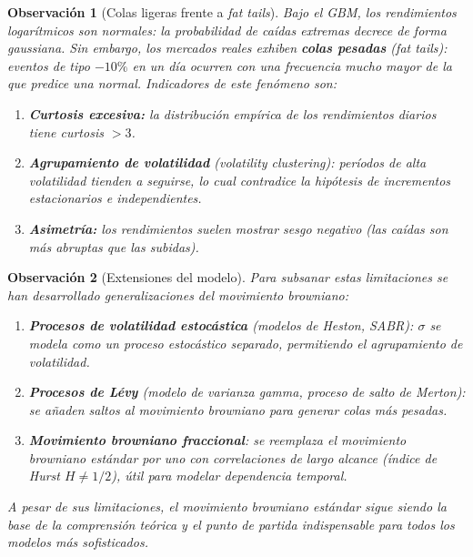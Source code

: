 \documentclass[12pt]{book}
\newtheorem{remark}{Observación}[chapter]
\begin{document}
\begin{remark}[Colas ligeras frente a \textit{fat tails}]
Bajo el GBM, los rendimientos logarítmicos son normales: la probabilidad de caídas extremas decrece de forma gaussiana. Sin embargo, los mercados reales exhiben \textbf{colas pesadas} (\textit{fat tails}): eventos de tipo $-10\%$ en un día ocurren con una frecuencia mucho mayor de la que predice una normal. Indicadores de este fenómeno son:
\begin{enumerate}
    \item[\normalfont(a)] \textbf{Curtosis excesiva:} la distribución empírica de los rendimientos diarios tiene curtosis $> 3$.
    \item[\normalfont(b)] \textbf{Agrupamiento de volatilidad} (\textit{volatility clustering}): períodos de alta volatilidad tienden a seguirse, lo cual contradice la hipótesis de incrementos estacionarios e independientes.
    \item[\normalfont(c)] \textbf{Asimetría:} los rendimientos suelen mostrar sesgo negativo (las caídas son más abruptas que las subidas).
\end{enumerate}
\end{remark}

\begin{remark}[Extensiones del modelo]
Para subsanar estas limitaciones se han desarrollado generalizaciones del movimiento browniano:
\begin{enumerate}
    \item[\normalfont(a)] \textbf{Procesos de volatilidad estocástica} (modelos de Heston, SABR): $\sigma$ se modela como un proceso estocástico separado, permitiendo el agrupamiento de volatilidad.
    \item[\normalfont(b)] \textbf{Procesos de Lévy} (modelo de varianza gamma, proceso de salto de Merton): se añaden saltos al movimiento browniano para generar colas más pesadas.
    \item[\normalfont(c)] \textbf{Movimiento browniano fraccional}: se reemplaza el movimiento browniano estándar por uno con correlaciones de largo alcance (índice de Hurst $H \ne 1/2$), útil para modelar dependencia temporal.
\end{enumerate}
A pesar de sus limitaciones, el movimiento browniano estándar sigue siendo la base de la comprensión teórica y el punto de partida indispensable para todos los modelos más sofisticados.
\end{remark}
\end{document}
